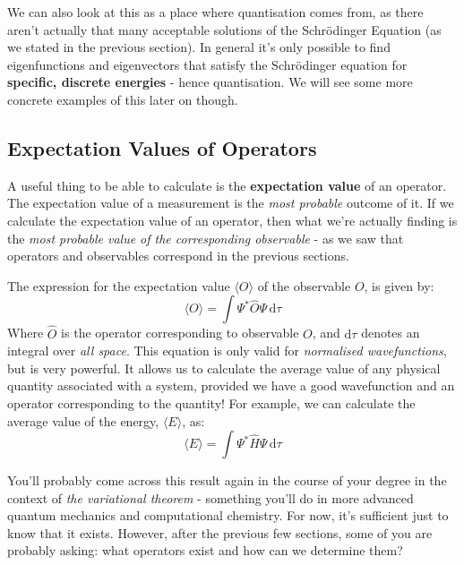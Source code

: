 \documentclass{memoir}[11pt,oneside,a4paper,openany]
\newcommand{\wf}{\ensuremath{\Psi}\xspace}
\begin{document}
We can also look at this as a place where quantisation comes from, as there aren't actually that many acceptable solutions of the Schr{\"o}dinger Equation (as we stated in the previous section). In general it's only possible to find eigenfunctions and eigenvectors that satisfy the Schr{\"o}dinger equation for \textbf{specific, discrete energies} - hence quantisation. We will see some more concrete examples of this later on though. 

\subsection{Expectation Values of Operators}
A useful thing to be able to calculate is the \textbf{expectation value} of an operator. The expectation value of a measurement is the \emph{most probable} outcome of it. If we calculate the expectation value of an operator, then what we're actually finding is the \emph{most probable value of the corresponding observable} - as we saw that operators and observables correspond in the previous sections.

The expression for the expectation value $\langle O \rangle$ of the observable $O$, is given by:
\begin{equation}
	\langle O \rangle = \int \wf^* \hat{O} \wf \,\mathrm{d}\tau
\end{equation}
Where $\hat{O}$ is the operator corresponding to observable $O$, and $\mathrm{d}\tau$ denotes an integral over \emph{all space}. This equation is only valid for \emph{normalised wavefunctions}, but is very powerful. It allows us to calculate the average value of any physical quantity associated with a system, provided we have a good wavefunction and an operator corresponding to the quantity! For example, we can calculate the average value of the energy, $\langle E \rangle$, as:
\begin{equation}
	\langle E \rangle = \int \wf^* \hat{H} \wf \,\mathrm{d}\tau
\end{equation}

You'll probably come across this result again in the course of your degree in the context of \emph{the variational theorem} - something you'll do in more advanced quantum mechanics and computational chemistry. For now, it's sufficient just to know that it exists. However, after the previous few sections, some of you are probably asking: what operators exist and how can we determine them?
\end{document}
